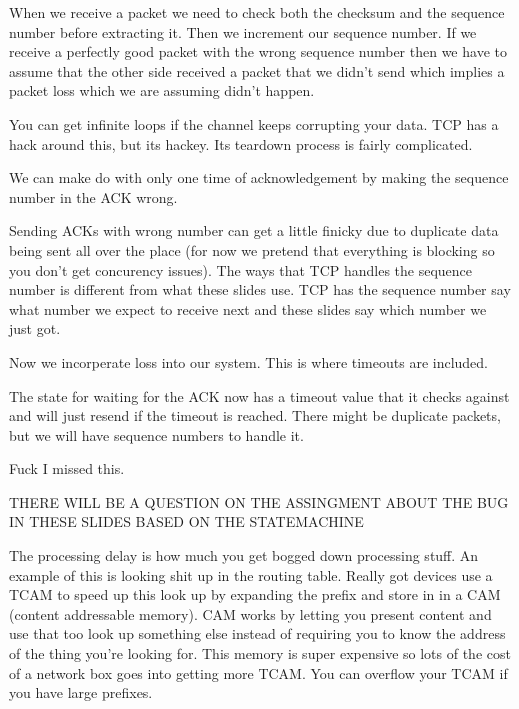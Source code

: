 \documentclass{article}
\begin{document}

When we receive a packet we need to check both the checksum and the sequence number before extracting it. Then we increment our sequence number. If we receive a perfectly good packet with the wrong sequence number then we have to assume that the other side received a packet that we didn't send which implies a packet loss which we are assuming didn't happen. 


You can get infinite loops if the channel keeps corrupting your data. TCP has a hack around this, but its hackey. Its teardown process is fairly complicated.


We can make do with only one time of acknowledgement by making the sequence number in the ACK wrong.


Sending ACKs with wrong number can get a little finicky due to duplicate data being sent all over the place (for now we pretend that everything is blocking so you don't get concurency issues). The ways that TCP handles the sequence number is different from what these slides use. TCP has the sequence number say what number we expect to receive next and these slides say which number we just got.



Now we incorperate loss into our system. This is where timeouts are included.



The state for waiting for the ACK now has a timeout value that it checks against and will just resend if the timeout is reached. There might be duplicate packets, but we will have sequence numbers to handle it.



Fuck I missed this.


THERE WILL BE A QUESTION ON THE ASSINGMENT ABOUT THE BUG IN THESE SLIDES BASED ON THE STATEMACHINE



The processing delay is how much you get bogged down processing stuff. An example of this is looking shit up in the routing table. Really got devices use a TCAM to speed up this look up by expanding the prefix and store in in a CAM (content addressable memory). CAM works by letting you present content and use that too look up something else instead of requiring you to know the address of the thing you're looking for. This memory is super expensive so lots of the cost of a network box goes into getting more TCAM. You can overflow your TCAM if you have large prefixes.
\end{document}

